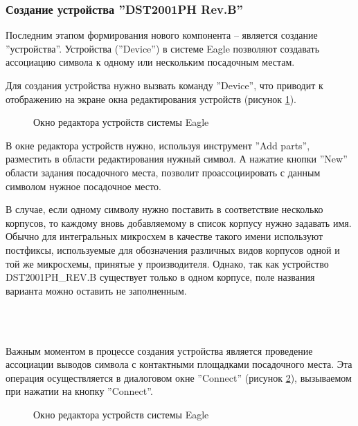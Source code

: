\subsubsection{Создание устройства ''DST2001PH Rev.B''}
\begin{par}
Последним этапом формирования нового компонента -- является создание ''устройства''.
Устройства (''Device'') в системе Eagle позволяют создавать ассоциацию символа к
одному или нескольким посадочным местам.

Для создания устройства нужно вызвать команду ''Device'', что приводит к отображению на экране
окна редактирования устройств (рисунок \ref{img:device}).
\begin{figure}[ht]
	\caption{Окно редактора устройств системы Eagle}
	\label{img:device}
\end{figure}
\end{par}

В окне редактора устройств нужно, используя инструмент ''Add parts'', разместить в области
редактирования нужный символ. А нажатие кнопки ''New'' области задания посадочного места,
позволит проассоциировать с данным символом нужное посадочное место.

В случае, если одному символу нужно поставить в соответствие несколько корпусов, то каждому
вновь добавляемому в список корпусу нужно задавать имя. Обычно для интегральных
микросхем в качестве такого имени используют постфиксы, используемые для обозначения
различных видов корпусов одной и той же микросхемы, принятые у производителя. Однако,
так как устройство DST2001PH\_REV.B существует только в одном корпусе, поле названия варианта
можно оставить не заполненным.

~\\
~\\
\begin{par}
Важным моментом в процессе создания устройства является проведение ассоциации выводов
символа с контактными площадками посадочного места. Эта операция осуществляется
в диалоговом окне ''Connect'' (рисунок \ref{img:devConnect}), вызываемом при нажатии на кнопку ''Connect''.
\begin{figure}[hb]
	\caption{Окно редактора устройств системы Eagle}
	\label{img:devConnect}
\end{figure}
\end{par}
\newpage{}
